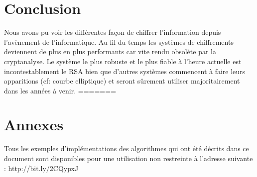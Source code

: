 \chapter*{Conclusion}
Nous avons pu voir les différentes façon de chiffrer l'information depuis l'avènement de l'informatique. Au fil du temps les systèmes de chiffrements deviennent de plus en plus performants car vite rendu obsolète par la cryptanalyse. Le système le plus robuste et le plus fiable à l'heure actuelle est incontestablement le RSA bien que d'autres systèmes commencent à faire leurs apparitions (cf: courbe elliptique) et seront sûrement utiliser majoritairement dans les années à venir.
=======
\chapter{Annexes}
Tous les exemples d'implémentations des algorithmes qui ont été décrits dans ce document sont disponibles pour une utilisation non restreinte à l'adresse suivante : http://bit.ly/2CQypxJ
